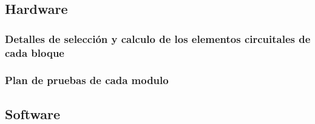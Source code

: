 

%


  \subsection{Hardware}  



  \subsubsection{Detalles de selección y calculo de los elementos circuitales de cada bloque}  

  \newpage



  \subsubsection{Plan de pruebas de cada modulo}  

  \newpage



  \subsection{Software}  

  \newpage



